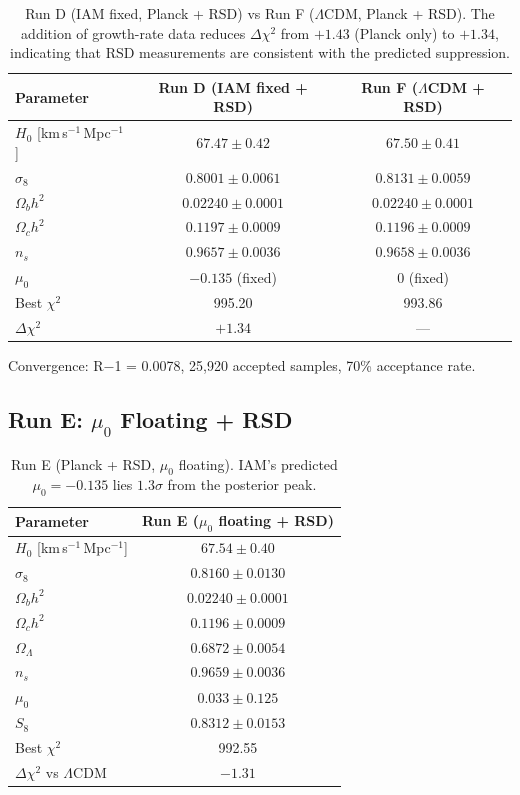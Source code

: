 \documentclass[11pt,letterpaper]{article}
\begin{document}
\begin{table}[h]
\centering
\begin{tabular}{lcc}
\toprule
Parameter & Run D (IAM fixed + RSD) & Run F ($\Lambda$CDM + RSD) \\
\midrule
$H_0$ [km\,s$^{-1}$\,Mpc$^{-1}$] & $67.47 \pm 0.42$ & $67.50 \pm 0.41$ \\
$\sigma_8$ & $0.8001 \pm 0.0061$ & $0.8131 \pm 0.0059$ \\
$\Omega_b h^2$ & $0.02240 \pm 0.0001$ & $0.02240 \pm 0.0001$ \\
$\Omega_c h^2$ & $0.1197 \pm 0.0009$ & $0.1196 \pm 0.0009$ \\
$n_s$ & $0.9657 \pm 0.0036$ & $0.9658 \pm 0.0036$ \\
$\mu_0$ & $-0.135$ (fixed) & $0$ (fixed) \\
\midrule
Best $\chi^2$ & 995.20 & 993.86 \\
$\Delta\chi^2$ & $+1.34$ & --- \\
\bottomrule
\end{tabular}
\caption{Run D (IAM fixed, Planck + RSD) vs Run F ($\Lambda$CDM, Planck + RSD). The addition of growth-rate data reduces $\Delta\chi^2$ from $+1.43$ (Planck only) to $+1.34$, indicating that RSD measurements are consistent with the predicted suppression.}
\label{tab:run_d}
\end{table}

Convergence: R$-$1 = 0.0078, 25{,}920 accepted samples, 70\% acceptance rate.

\subsection{Run E: $\mu_0$ Floating + RSD}

\begin{table}[h]
\centering
\begin{tabular}{lc}
\toprule
Parameter & Run E ($\mu_0$ floating + RSD) \\
\midrule
$H_0$ [km\,s$^{-1}$\,Mpc$^{-1}$] & $67.54 \pm 0.40$ \\
$\sigma_8$ & $0.8160 \pm 0.0130$ \\
$\Omega_b h^2$ & $0.02240 \pm 0.0001$ \\
$\Omega_c h^2$ & $0.1196 \pm 0.0009$ \\
$\Omega_\Lambda$ & $0.6872 \pm 0.0054$ \\
$n_s$ & $0.9659 \pm 0.0036$ \\
$\mu_0$ & $0.033 \pm 0.125$ \\
$S_8$ & $0.8312 \pm 0.0153$ \\
\midrule
Best $\chi^2$ & 992.55 \\
$\Delta\chi^2$ vs $\Lambda$CDM & $-1.31$ \\
\bottomrule
\end{tabular}
\caption{Run E (Planck + RSD, $\mu_0$ floating). IAM's predicted $\mu_0 = -0.135$ lies $1.3\sigma$ from the posterior peak.}
\label{tab:run_e}
\end{table}
\end{document}
